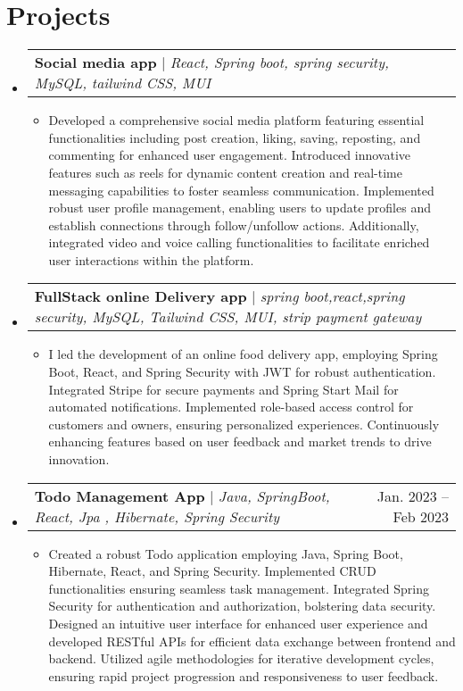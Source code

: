 \documentclass[letterpaper,11pt]{article}
\makeatletter
\newcommand{\resumeItem}[1]{
  \item\small{
    {#1 \vspace{-2pt}}
  }
}
\newcommand{\resumeSubSubheading}[2]{
    \item
    \begin{tabular*}{0.97\textwidth}{l@{\extracolsep{\fill}}r}
      \textit{\small#1} & \textit{\small #2} \\
    \end{tabular*}\vspace{-7pt}
}
\newcommand{\resumeProjectHeading}[2]{
    \item
    \begin{tabular*}{0.97\textwidth}{l@{\extracolsep{\fill}}r}
      \small#1 & #2 \\
    \end{tabular*}\vspace{-7pt}
}
\newcommand{\resumeSubHeadingListStart}{\begin{itemize}[leftmargin=0.15in, label={}]}
\newcommand{\resumeSubHeadingListEnd}{\end{itemize}}
\newcommand{\resumeItemListStart}{\begin{itemize}}
\newcommand{\resumeItemListEnd}{\end{itemize}\vspace{-5pt}}
\makeatother
\begin{document}

    
\section{Projects}
    \resumeSubHeadingListStart
    \resumeProjectHeading
          {\textbf{Social media app } $|$ \emph{React, Spring boot, spring security, MySQL, tailwind CSS, MUI }}{}
          \resumeItemListStart
            \resumeItem{Developed a comprehensive social media platform featuring essential functionalities including post creation, liking, saving, reposting, and commenting for enhanced user engagement. Introduced innovative features such as reels for dynamic content creation and real-time messaging capabilities to foster seamless communication. Implemented robust user profile management, enabling users to update profiles and establish connections through follow/unfollow actions. Additionally, integrated video and voice calling functionalities to facilitate enriched user interactions within the platform. }
          \resumeItemListEnd
     \resumeProjectHeading
          {\textbf{FullStack online Delivery app} $|$ \emph{spring boot,react,spring security, MySQL, Tailwind CSS, MUI, strip payment gateway}}{}
          \resumeItemListStart
            \resumeItem{I led the development of an online food delivery app, employing Spring Boot, React, and Spring Security with JWT for robust authentication. Integrated Stripe for secure payments and Spring Start Mail for automated notifications. Implemented role-based access control for customers and owners, ensuring personalized experiences. Continuously enhancing features based on user feedback and market trends to drive innovation. }
          \resumeItemListEnd
      \resumeProjectHeading
          {\textbf{Todo Management App} $|$ \emph{Java, SpringBoot, React, Jpa , Hibernate, Spring Security}}{Jan. 2023 -- Feb 2023 }
          \resumeItemListStart
            \resumeItem{Created a robust Todo application employing Java, Spring Boot, Hibernate, React, and Spring Security. Implemented CRUD functionalities ensuring seamless task management. Integrated Spring Security for authentication and authorization, bolstering data security. Designed an intuitive user interface for enhanced user experience and developed RESTful APIs for efficient data exchange between frontend and backend. Utilized agile methodologies for iterative development cycles, ensuring rapid project progression and responsiveness to user feedback.}
           \resumeItemListEnd
    \resumeSubHeadingListEnd
\end{document}
